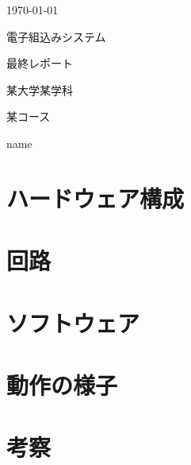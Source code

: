 \documentclass[a4paper,11pt]{jsarticle}
\begin{document}
\begin{titlepage}
  \begin{center}

    {\Large \today}

    \vspace{10truept}

    {\Large 電子組込みシステム}

    \vspace*{180truept}

    {\Huge 最終レポート}

    \vspace{270truept}

    {\Large 某大学某学科}

    \vspace{10truept}

    {\Large 某コース}

    \vspace{30truept}

    {\Large name}

  \end{center}
\end{titlepage}

\tableofcontents







\section{ハードウェア構成}




\section{回路}



\section{ソフトウェア}




\section{動作の様子}





\section{考察}
\end{document}
